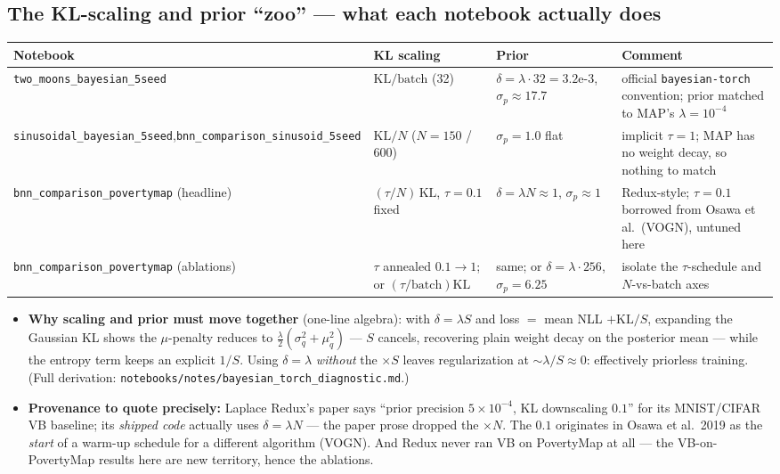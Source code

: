 \documentclass[10pt,a4paper]{article}
\newcommand{\code}[1]{\texttt{#1}}
\newcommand{\KL}{\mathrm{KL}}
\begin{document}
\subsection{The KL-scaling and prior ``zoo'' --- what each notebook actually does}
\begin{center}\small
\begin{tabular}{p{4.7cm}p{3.0cm}p{3.5cm}p{3.5cm}}
\toprule
Notebook & KL scaling & Prior & Comment\\
\midrule
\code{two\_moons\_bayesian\_5seed} & $\mathrm{KL}/\text{batch}$ (32) &
$\delta=\lambda\cdot32=3.2\text{e-}3$,\; $\sigma_p\approx17.7$ &
official \code{bayesian-torch} convention; prior matched to MAP's $\lambda{=}10^{-4}$\\
\code{sinusoidal\_bayesian\_5seed},\newline \code{bnn\_comparison\_sinusoid\_5seed} &
$\mathrm{KL}/N$ ($N{=}150$ / $600$) & $\sigma_p=1.0$ flat & implicit $\tau=1$; MAP has no weight
decay, so nothing to match\\
\code{bnn\_comparison\_povertymap} (headline) & $(\tau/N)\,\mathrm{KL}$, $\tau=0.1$ fixed &
$\delta=\lambda N\approx1$,\; $\sigma_p\approx1$ & Redux-style; $\tau{=}0.1$ borrowed from Osawa
et al.\ (VOGN), untuned here\\
\code{bnn\_comparison\_povertymap} (ablations) & $\tau$ annealed $0.1{\to}1$; or
$(\tau/\text{batch})\mathrm{KL}$ & same; or $\delta=\lambda\cdot256$, $\sigma_p=6.25$ & isolate the
$\tau$-schedule and $N$-vs-batch axes\\
\bottomrule
\end{tabular}
\end{center}
\begin{itemize}
\item \textbf{Why scaling and prior must move together} (one-line algebra): with
  $\delta=\lambda S$ and loss $=$ mean NLL $+\KL/S$, expanding the Gaussian KL shows the
  $\mu$-penalty reduces to $\frac{\lambda}{2}(\sigma_q^2+\mu_q^2)$ --- $S$ cancels, recovering
  plain weight decay on the posterior mean --- while the entropy term keeps an explicit $1/S$.
  Using $\delta=\lambda$ \emph{without} the $\times S$ leaves regularization at
  $\sim\lambda/S\approx0$: effectively priorless training. (Full derivation:
  \code{notebooks/notes/bayesian\_torch\_diagnostic.md}.)
\item \textbf{Provenance to quote precisely:} Laplace Redux's paper says ``prior precision
  $5\times10^{-4}$, KL downscaling $0.1$'' for its MNIST/CIFAR VB baseline; its \emph{shipped
  code} actually uses $\delta=\lambda N$ --- the paper prose dropped the $\times N$. The $0.1$
  originates in Osawa et al.\ 2019 as the \emph{start} of a warm-up schedule for a different
  algorithm (VOGN). And Redux never ran VB on PovertyMap at all --- the VB-on-PovertyMap results
  here are new territory, hence the ablations.
\end{itemize}
\end{document}
